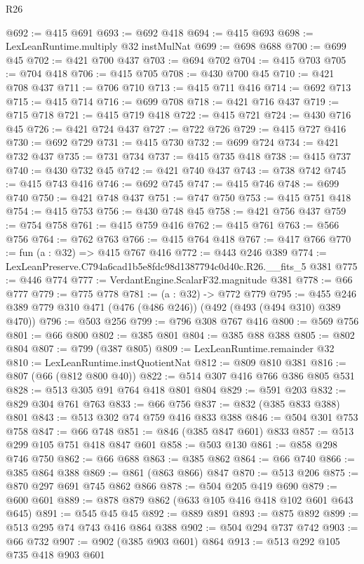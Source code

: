\begin{lexlean}{R26}
\begin{coremodule}
@692 := @415 @691
@693 := @692 @418
@694 := @415 @693
@698 := LexLeanRuntime.multiply @32 instMulNat
@699 := @698 @688
@700 := @699 @45
@702 := @421 @700 @437
@703 := @694 @702
@704 := @415 @703
@705 := @704 @418
@706 := @415 @705
@708 := @430 @700 @45
@710 := @421 @708 @437
@711 := @706 @710
@713 := @415 @711 @416
@714 := @692 @713
@715 := @415 @714
@716 := @699 @708
@718 := @421 @716 @437
@719 := @715 @718
@721 := @415 @719 @418
@722 := @415 @721
@724 := @430 @716 @45
@726 := @421 @724 @437
@727 := @722 @726
@729 := @415 @727 @416
@730 := @692 @729
@731 := @415 @730
@732 := @699 @724
@734 := @421 @732 @437
@735 := @731 @734
@737 := @415 @735 @418
@738 := @415 @737
@740 := @430 @732 @45
@742 := @421 @740 @437
@743 := @738 @742
@745 := @415 @743 @416
@746 := @692 @745
@747 := @415 @746
@748 := @699 @740
@750 := @421 @748 @437
@751 := @747 @750
@753 := @415 @751 @418
@754 := @415 @753
@756 := @430 @748 @45
@758 := @421 @756 @437
@759 := @754 @758
@761 := @415 @759 @416
@762 := @415 @761
@763 := @566 @756
@764 := @762 @763
@766 := @415 @764 @418
@767 := @417 @766
@770 := fun (a : @32) => @415 @767 @416
@772 := @443 @246 @389
@774 := LexLeanPreserve.C794a6cad1b5e8fdc98d1387794c0d40c.R26.__fits_5 @381
@775 := @446 @774
@777 := VerdantEngine.ScalarF32.magnitude @381
@778 := @66 @777
@779 := @775 @778
@781 := (a : @32) -> @772 @779
@795 := @455 @246 @389 @779 @310 @471 (@476 (@486 @246)) (@492 (@493 (@494 @310) @389 @470))
@796 := @503 @256
@799 := @796 @308 @767 @416
@800 := @569 @756
@801 := @66 @800
@802 := @385 @801
@804 := @385 @88 @388
@805 := @802 @804
@807 := @799 (@387 @805)
@809 := LexLeanRuntime.remainder @32
@810 := LexLeanRuntime.instQuotientNat
@812 := @809 @810 @381
@816 := @807 (@66 (@812 @800 @40))
@822 := @514 @307 @416 @766 @386 @805 @531
@828 := @513 @305 @91 @764 @418 @801 @804
@829 := @591 @203
@832 := @829 @304 @761 @763
@833 := @66 @756
@837 := @832 (@385 @833 @388) @801
@843 := @513 @302 @74 @759 @416 @833 @388
@846 := @504 @301 @753 @758
@847 := @66 @748
@851 := @846 (@385 @847 @601) @833
@857 := @513 @299 @105 @751 @418 @847 @601
@858 := @503 @130
@861 := @858 @298 @746 @750
@862 := @66 @688
@863 := @385 @862
@864 := @66 @740
@866 := @385 @864 @388
@869 := @861 (@863 @866) @847
@870 := @513 @206
@875 := @870 @297 @691 @745 @862 @866
@878 := @504 @205 @419 @690
@879 := @600 @601
@889 := @878 @879 @862 (@633 @105 @416 @418 @102 @601 @643 @645)
@891 := @545 @45 @45
@892 := @889 @891
@893 := @875 @892
@899 := @513 @295 @74 @743 @416 @864 @388
@902 := @504 @294 @737 @742
@903 := @66 @732
@907 := @902 (@385 @903 @601) @864
@913 := @513 @292 @105 @735 @418 @903 @601

\end{coremodule}
\end{lexlean}
